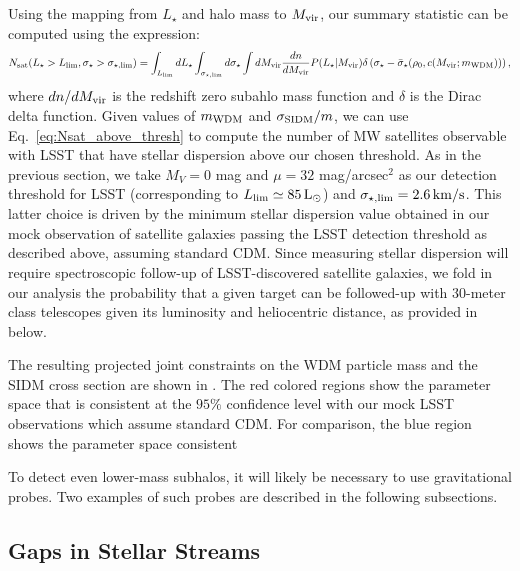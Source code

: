 Using the mapping from $L_\star$ and halo mass to $M_{\rm vir}$, our summary statistic can be computed using the expression:
\begin{equation}\label{eq:Nsat_above_thresh}
 N_{\rm sat}(L_\star>L_{\rm lim}, \sigma_\star> \sigma_{\star,\rm lim}) =  \int_{L_{\rm lim}} dL_\star \int_{\sigma_{\star,\rm lim}} d\sigma_\star \int dM_{\rm vir} \frac{dn}{d M_{\rm vir}} P(L_\star|M_{\rm vir})
 \delta\left(\sigma_\star-\bar{\sigma}_\star(\rho_0,c(M_{\rm vir};m_{\rm WDM}))\right),
\end{equation}
where $dn/dM_{\rm vir}$ is the redshift zero subahlo mass function and $\delta$ is the Dirac delta function. Given values of $m_{\rm WDM}$ and $\sigma_{\rm SIDM}/m$, we can use Eq.~\eqref{eq:Nsat_above_thresh} to compute the number of MW satellites observable with LSST that have stellar dispersion above our chosen threshold. As in the previous section,
we take $M_V=0$ mag and $\mu=32$ mag/arcsec$^2$ as our detection threshold for LSST (corresponding to $L_{\rm lim}\simeq 85 \,{\rm L}_\odot$) and $\sigma_{\star,\rm lim}=2.6\, {\rm km}/{\rm s}$. This latter choice is driven by the minimum stellar dispersion value obtained in our mock observation of satellite galaxies passing the LSST detection threshold as described above, assuming standard CDM. Since measuring stellar dispersion will require spectroscopic follow-up of LSST-discovered satellite galaxies, we fold in our analysis the probability that a given target can be followed-up with 30-meter class telescopes given its luminosity and heliocentric distance, as provided in  below. 

The resulting projected joint constraints on the WDM particle mass and the SIDM cross section are shown in . The red colored regions show the parameter space that is consistent at the $95\%$ confidence level with our mock LSST observations which assume standard CDM. For comparison, the blue region shows the parameter space consistent 

To detect even lower-mass subhalos, it will likely be necessary to use gravitational probes. Two examples of such probes are described in the following subsections. 




\subsection{Gaps in Stellar Streams }
\label{sec:stream_gaps}


